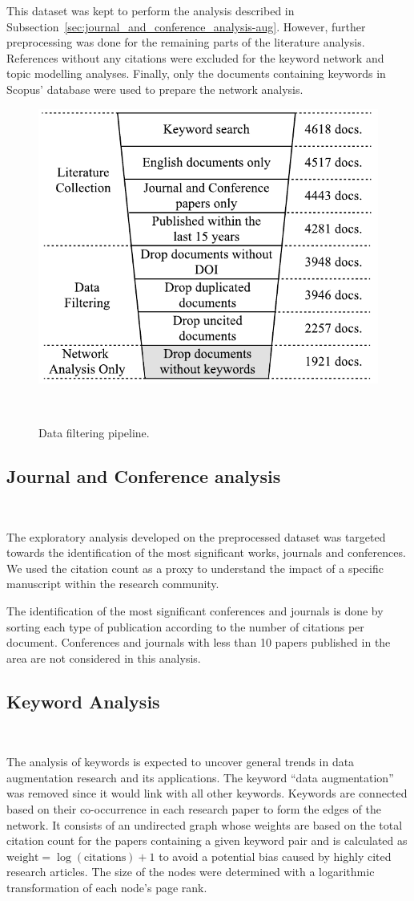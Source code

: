 This dataset was kept to perform the analysis described in
Subsection~\ref{sec:journal_and_conference_analysis-aug}. However, further
preprocessing was done for the remaining parts of the literature analysis.
References without any citations were excluded for the keyword network and
topic modelling analyses. Finally, only the documents containing keywords in
Scopus' database were used to prepare the network analysis.

\begin{figure}
	\centering
    \includegraphics[width=.6\linewidth]{data_filtering_pipeline}
    \caption{Data filtering pipeline.
    }~\label{fig:data_filtering_pipeline}
\end{figure}

\subsection{Journal and Conference
analysis}~\label{sec:journal_and_conference_analysis-aug}

The exploratory analysis developed on the preprocessed dataset was targeted
towards the identification of the most significant works, journals and
conferences. We used the citation count as a proxy to understand the impact of
a specific manuscript within the research community.

The identification of the most significant conferences and journals is done by
sorting each type of publication according to the number of citations per
document. Conferences and journals with less than 10 papers published in the
area are not considered in this analysis. 

\subsection{Keyword Analysis}~\label{sec:keyword_analysis-aug}

The analysis of keywords is expected to uncover general trends in data
augmentation research and its applications. The keyword ``data augmentation''
was removed since it would link with all other keywords. Keywords are
connected based on their co-occurrence in each research paper to form the
edges of the network.  It consists of an undirected graph whose weights are
based on the total citation count for the papers containing a given keyword
pair and is calculated as $\textrm{weight} = \log(\textrm{citations}) + 1$ to
avoid a potential bias caused by highly cited research articles. The size of
the nodes were determined with a logarithmic transformation of each
node's page rank.


